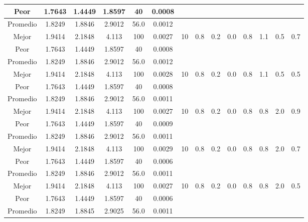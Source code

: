 \begin{table}[h!]
\begin{center}
\begin{tabular}{|c|c|c|c|c|c|c|c|c|c|c|c|c|c|}
            \cline{1-6}
            Peor & 1.7643 & 1.4449  & 1.8597 & 40 & 0.0008 &  &  &  &  &  &  &  & \\
        \hline
        \hline
            Promedio  & 1.8249 & 1.8846 & 2.9012 & 56.0 & 0.0012 &  &  &  &  &  &  &  & \\
            \cline{1-6}
            Mejor & 1.9414 & 2.1848  & 4.113 & 100 & 0.0027 & 10 & 0.8 & 0.2 & 0.0 & 0.8 & 1.1 & 0.5 & 0.7\\
            \cline{1-6}
            Peor & 1.7643 & 1.4449  & 1.8597 & 40 & 0.0008 &  &  &  &  &  &  &  & \\
        \hline
        \hline
            Promedio  & 1.8249 & 1.8846 & 2.9012 & 56.0 & 0.0012 &  &  &  &  &  &  &  & \\
            \cline{1-6}
            Mejor & 1.9414 & 2.1848  & 4.113 & 100 & 0.0028 & 10 & 0.8 & 0.2 & 0.0 & 0.8 & 1.1 & 0.5 & 0.5\\
            \cline{1-6}
            Peor & 1.7643 & 1.4449  & 1.8597 & 40 & 0.0008 &  &  &  &  &  &  &  & \\
        \hline
        \hline
            Promedio  & 1.8249 & 1.8846 & 2.9012 & 56.0 & 0.0011 &  &  &  &  &  &  &  & \\
            \cline{1-6}
            Mejor & 1.9414 & 2.1848  & 4.113 & 100 & 0.0027 & 10 & 0.8 & 0.2 & 0.0 & 0.8 & 0.8 & 2.0 & 0.9\\
            \cline{1-6}
            Peor & 1.7643 & 1.4449  & 1.8597 & 40 & 0.0009 &  &  &  &  &  &  &  & \\
        \hline
        \hline
            Promedio  & 1.8249 & 1.8846 & 2.9012 & 56.0 & 0.0011 &  &  &  &  &  &  &  & \\
            \cline{1-6}
            Mejor & 1.9414 & 2.1848  & 4.113 & 100 & 0.0029 & 10 & 0.8 & 0.2 & 0.0 & 0.8 & 0.8 & 2.0 & 0.7\\
            \cline{1-6}
            Peor & 1.7643 & 1.4449  & 1.8597 & 40 & 0.0006 &  &  &  &  &  &  &  & \\
        \hline
        \hline
            Promedio  & 1.8249 & 1.8846 & 2.9012 & 56.0 & 0.0011 &  &  &  &  &  &  &  & \\
            \cline{1-6}
            Mejor & 1.9414 & 2.1848  & 4.113 & 100 & 0.0027 & 10 & 0.8 & 0.2 & 0.0 & 0.8 & 0.8 & 2.0 & 0.5\\
            \cline{1-6}
            Peor & 1.7643 & 1.4449  & 1.8597 & 40 & 0.0006 &  &  &  &  &  &  &  & \\
        \hline
        \hline
            Promedio  & 1.8249 & 1.8845 & 2.9025 & 56.0 & 0.0011 &  &  &  &  &  &  &  & \\

\end{tabular}
\end{center}
\end{table}
